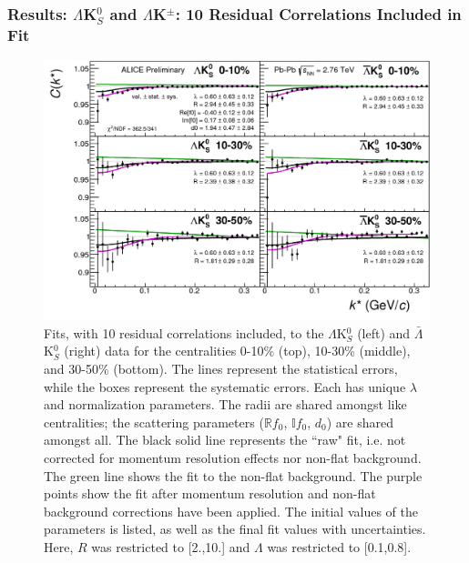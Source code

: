 \documentclass[../AnalysisNoteJBuxton.tex]{subfiles}
\begin{document}
\subsubsection{Results: \texorpdfstring{$\Lambda$K$^{0}_{S}$ and $\Lambda$K$^{\pm}$: 10 Residual Correlations Included in Fit}{TEXT}}
\label{ResultsLamK_10Res}

\begin{figure}[h]
  \centering
  \includegraphics[width=\textwidth]{7_ResultsAndDiscussion/Figures/canKStarCfwFitsLamK0wConj_0010_1030_3050_MomResCrctn_NonFlatBgdCrctn_SingleLamParam_10Res_PrimMaxDecay4fm_UsingXiDataAndCoulombOnly.pdf}
  \caption[$\Lambda$K$^{0}_{S}$($\bar{\Lambda}$K$^{0}_{S}$) Fits with 10 Residuals]{Fits, with 10 residual correlations included, to the $\Lambda$K$^{0}_{S}$ (left) and $\bar{\Lambda}$K$^{0}_{S}$ (right) data for the centralities 0-10\% (top), 10-30\% (middle), and 30-50\% (bottom).
The lines represent the statistical errors, while the boxes represent the systematic errors.
Each has unique $\lambda$ and normalization parameters.
The radii are shared amongst like centralities; the scattering parameters ($\mathbb{R}f_{0}$, $\mathbb{I}f_{0}$, $d_{0}$) are shared amongst all.
The black solid line represents the ``raw" fit, i.e. not corrected for momentum resolution effects nor non-flat background.  
The green line shows the fit to the non-flat background.
The purple points show the fit after momentum resolution and non-flat background corrections have been applied.
The initial values of the parameters is listed, as well as the final fit values with uncertainties.
Here, $R$ was restricted to [2.,10.] and $\Lambda$ was restricted to [0.1,0.8].}
  \label{fig:LamK0wConjFits_10Res}
\end{figure}
\end{document}
